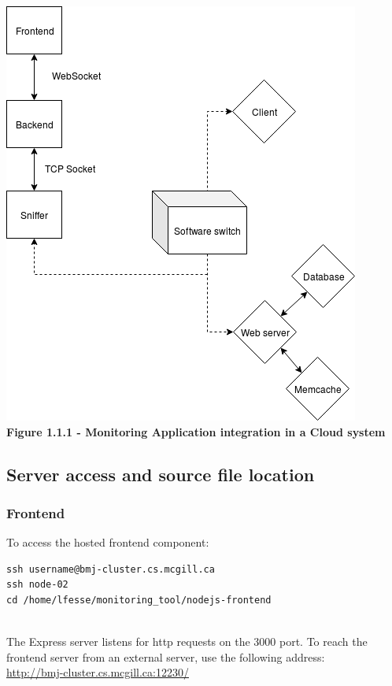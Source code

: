 \documentclass[12pt,hidelinks]{article}
\begin{document}
	\begin{center}	
	\includegraphics[scale=0.5]{assets/app-architecture.png} \\
	\textbf{Figure 1.1.1 - Monitoring Application integration
	in a Cloud system}
	\end{center}

	\subsection{Server access and source file location}
	\subsubsection{Frontend}

    To access the hosted frontend component:
    \begin{verbatim}
ssh username@bmj-cluster.cs.mcgill.ca
ssh node-02
cd /home/lfesse/monitoring_tool/nodejs-frontend
\end{verbatim}
\\
The Express server listens for http requests on the 3000 port.
To reach the frontend server from an external server, use the following address: \\ 
\url{http://bmj-cluster.cs.mcgill.ca:12230/}
	
\end{document}

